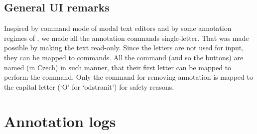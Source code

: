 \subsection{General UI remarks}
Inspired by command mode of modal text editors and by some annotation regimes of \tred, we made all the annotation commands single-letter. That was made possible by making the text read-only. Since the letters are not used for input, they can be mapped to commands. All the command (and so the buttons) are named (in Czech) in such manner, that their first letter can be mapped to perform the command. Only the command for removing annotation is mapped to the capital letter (`O' for `odstranit') for safety reasons.


\section{Annotation logs}
\label{sec:logs}
\todo


